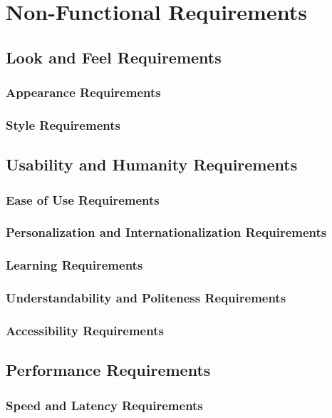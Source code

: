 \documentclass[12pt, titlepage]{article}
\begin{document}
\section{Non-Functional Requirements}

  \subsection {Look and Feel Requirements}

    \subsubsection{Appearance Requirements}
    \subsubsection{Style Requirements}

  \subsection{Usability and Humanity Requirements}

    \subsubsection{Ease of Use Requirements}
    \subsubsection{Personalization and Internationalization Requirements}
    \subsubsection{Learning Requirements}
    \subsubsection{Understandability and Politeness Requirements}
    \subsubsection{Accessibility Requirements}

  \subsection{Performance Requirements}

    \subsubsection{Speed and Latency Requirements}
\end{document}
